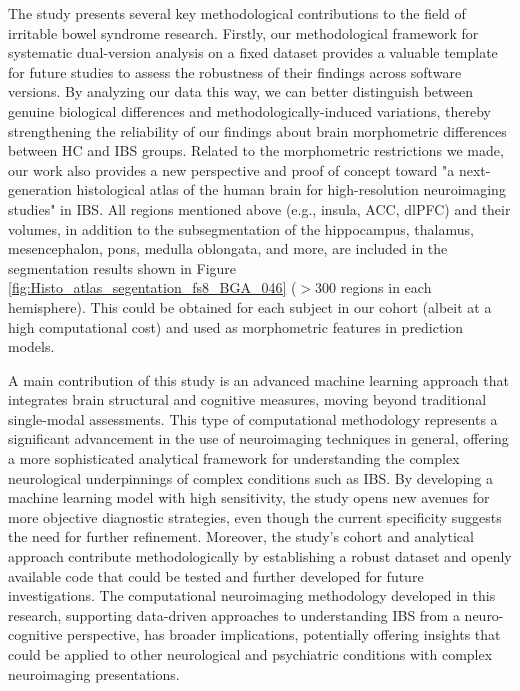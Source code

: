\documentclass[diagnostics,article,accept,pdftex,moreauthors]{Definitions/mdpi}
\begin{document}
The study presents several key methodological contributions to the field of irritable bowel syndrome research. {Firstly, our methodological framework for systematic dual-version analysis on a fixed dataset provides a valuable template for future studies to assess the robustness of their findings across software versions. By analyzing our data this way, we can better distinguish between genuine biological differences and methodologically-induced variations, thereby strengthening the reliability of our findings about brain morphometric differences between HC and IBS groups.} Related to the morphometric restrictions we made, our work also provides a new perspective and proof of concept toward "a next-generation histological atlas of the human brain for high-resolution neuroimaging studies" \cite{casamitjana2024next} in IBS. All regions mentioned above (e.g., insula, ACC, dlPFC) and their volumes, in addition to the subsegmentation of the hippocampus, thalamus, mesencephalon, pons, medulla oblongata, and more, are included in the segmentation results shown in Figure \ref{fig:Histo_atlas_segentation_fs8_BGA_046} ($> 300$ regions in each hemisphere). This could be obtained for each subject in our cohort (albeit at a high computational cost) and used as morphometric features in prediction models. 

A main contribution of this study is an advanced machine learning approach that integrates brain structural and cognitive measures, moving beyond traditional single-modal assessments. This type of computational methodology represents a significant advancement in the use of neuroimaging techniques in general, offering a more sophisticated analytical framework for understanding the complex neurological underpinnings of complex conditions such as IBS. By developing a machine learning model with high sensitivity, the study opens new avenues for more objective diagnostic strategies, even though the current specificity suggests the need for further refinement. Moreover, the study's cohort and analytical approach contribute methodologically by establishing a robust dataset and openly available code that could be tested and further developed for future investigations. The computational neuroimaging methodology developed in this research, supporting data-driven approaches to understanding IBS from a neuro-cognitive perspective, has broader implications, potentially offering insights that could be applied to other neurological and psychiatric conditions with complex neuroimaging presentations.
\end{document}

